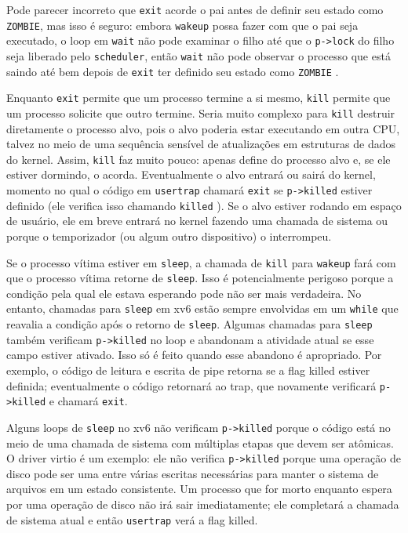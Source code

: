 {Pode parecer incorreto que \lstinline{exit} acorde o pai
antes de definir seu estado como \lstinline{ZOMBIE},
mas isso é seguro:
embora
\lstinline{wakeup}
possa fazer com que o pai seja executado,
o loop em
\lstinline{wait}
não pode examinar o filho até que o
\lstinline{p->lock} do filho seja liberado pelo {\tt scheduler},
então
\lstinline{wait}
não pode observar
o processo que está saindo até bem depois de
\lstinline{exit}
ter definido seu estado como
\lstinline{ZOMBIE}
.

Enquanto
\lstinline{exit}
permite que um processo termine a si mesmo,
\lstinline{kill}
permite que um processo solicite que outro termine.
Seria muito complexo para
\lstinline{kill}
destruir diretamente o processo alvo, pois o alvo
poderia estar executando em outra CPU, talvez
no meio de uma sequência sensível de atualizações em estruturas de dados do kernel.
Assim,
\lstinline{kill}
faz muito pouco: apenas define
do processo alvo e, se ele estiver dormindo, o acorda.
Eventualmente o alvo entrará ou sairá do kernel,
momento no qual o código em
\lstinline{usertrap}
chamará
\lstinline{exit}
se
\lstinline{p->killed}
estiver definido
(ele verifica isso chamando
\lstinline{killed}
).
Se o alvo estiver rodando em espaço de usuário, ele em breve entrará
no kernel fazendo uma chamada de sistema ou porque o temporizador (ou
algum outro dispositivo) o interrompeu.

Se o processo vítima estiver em
\lstinline{sleep},
a chamada de
\lstinline{kill}
para
\lstinline{wakeup}
fará com que o processo vítima retorne de
\lstinline{sleep}.
Isso é potencialmente perigoso porque
a condição pela qual ele estava esperando pode não ser mais verdadeira.
No entanto, chamadas para
\lstinline{sleep}
em xv6 estão sempre envolvidas em um
\lstinline{while}
que reavalia a condição após o retorno de
\lstinline{sleep}.
Algumas chamadas para
\lstinline{sleep}
também verificam
\lstinline{p->killed}
no loop e abandonam a atividade atual se esse campo estiver ativado.
Isso só é feito quando esse abandono é apropriado.
Por exemplo, o código de leitura e escrita de pipe
retorna se a flag killed estiver definida; eventualmente o
código retornará ao trap, que novamente
verificará \lstinline{p->killed} e chamará \lstinline{exit}.

Alguns loops de
\lstinline{sleep}
no xv6 não verificam
\lstinline{p->killed}
porque o código está no meio de uma chamada de sistema
com múltiplas etapas que devem ser atômicas.
O driver virtio
é um exemplo: ele não verifica
\lstinline{p->killed}
porque uma operação de disco pode ser uma entre várias
escritas necessárias para manter o sistema de arquivos
em um estado consistente.
Um processo que for morto enquanto espera por uma operação de disco
não irá sair imediatamente; ele completará a chamada de sistema atual
e então \lstinline{usertrap} verá a flag killed.

}
